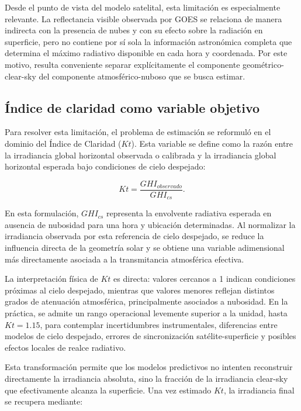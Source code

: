 \documentclass[../main.tex]{subfiles}
\begin{document}
Desde el punto de vista del modelo satelital, esta limitación es especialmente relevante. La reflectancia visible observada por GOES se relaciona de manera indirecta con la presencia de nubes y con su efecto sobre la radiación en superficie, pero no contiene por sí sola la información astronómica completa que determina el máximo radiativo disponible en cada hora y coordenada. Por este motivo, resulta conveniente separar explícitamente el componente geométrico-clear-sky del componente atmosférico-nuboso que se busca estimar.

\subsection{Índice de claridad como variable objetivo}

Para resolver esta limitación, el problema de estimación se reformuló en el dominio del Índice de Claridad ($Kt$). Esta variable se define como la razón entre la irradiancia global horizontal observada o calibrada y la irradiancia global horizontal esperada bajo condiciones de cielo despejado:

\begin{equation}
Kt = \frac{GHI_{observado}}{GHI_{cs}}.
\end{equation}

En esta formulación, $GHI_{cs}$ representa la envolvente radiativa esperada en ausencia de nubosidad para una hora y ubicación determinadas. Al normalizar la irradiancia observada por esta referencia de cielo despejado, se reduce la influencia directa de la geometría solar y se obtiene una variable adimensional más directamente asociada a la transmitancia atmosférica efectiva.

La interpretación física de $Kt$ es directa: valores cercanos a 1 indican condiciones próximas al cielo despejado, mientras que valores menores reflejan distintos grados de atenuación atmosférica, principalmente asociados a nubosidad. En la práctica, se admite un rango operacional levemente superior a la unidad, hasta $Kt = 1.15$, para contemplar incertidumbres instrumentales, diferencias entre modelos de cielo despejado, errores de sincronización satélite-superficie y posibles efectos locales de realce radiativo.

Esta transformación permite que los modelos predictivos no intenten reconstruir directamente la irradiancia absoluta, sino la fracción de la irradiancia clear-sky que efectivamente alcanza la superficie. Una vez estimado $Kt$, la irradiancia final se recupera mediante:
\end{document}
